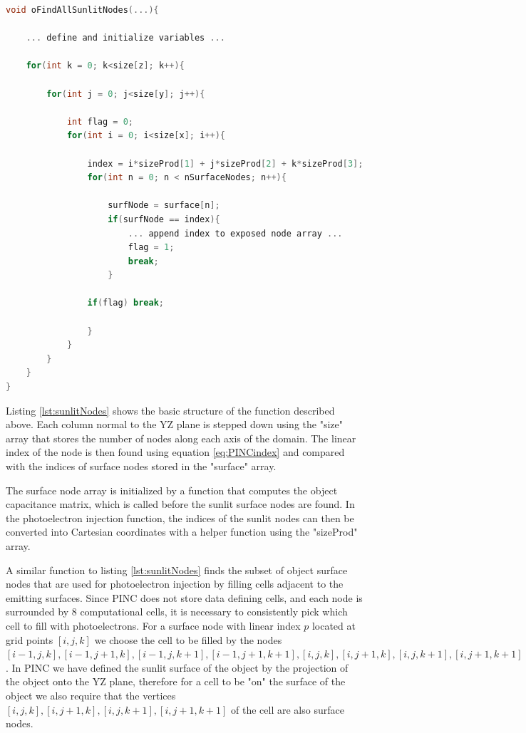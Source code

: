 \begin{minipage}{\linewidth}
\begin{lstlisting}[language=C, caption={Pseudo code for finding sunlit object surface nodes},
label={lst:sunlitNodes}]
void oFindAllSunlitNodes(...){

    ... define and initialize variables ...

    for(int k = 0; k<size[z]; k++){
    
        for(int j = 0; j<size[y]; j++){
                
            int flag = 0;
            for(int i = 0; i<size[x]; i++){
                
                index = i*sizeProd[1] + j*sizeProd[2] + k*sizeProd[3];
                for(int n = 0; n < nSurfaceNodes; n++){
                    
                    surfNode = surface[n];
                    if(surfNode == index){
                        ... append index to exposed node array ...
                        flag = 1;
                        break;
                    }
                    
                if(flag) break;
                
                }
            }
        }
    }
}
\end{lstlisting}
\end{minipage}

\vspace{1cm}
Listing \ref{lst:sunlitNodes} shows the basic structure of the function described above. Each column normal to the YZ plane is stepped down using the "size" array that stores the number of nodes along each axis of the domain. The linear index of the node is then found using equation \eqref{eq:PINCindex} and compared with the indices of surface nodes stored in the "surface" array. 

The surface node array is initialized by a function that computes the object capacitance matrix, which is called before the sunlit surface nodes are found. In the photoelectron injection function, the indices of the sunlit nodes can then be converted into Cartesian coordinates with a helper function using the "sizeProd" array. 

A similar function to listing \ref{lst:sunlitNodes} finds the subset of object surface nodes that are used for photoelectron injection by filling cells adjacent to the emitting surfaces.
Since PINC does not store data defining cells, and each node is surrounded by 8 computational cells, it is necessary to consistently pick which cell to fill with photoelectrons. For a surface node with linear index $p$ located at grid points $[i,j,k]$ we choose the cell to be filled by the nodes $[i-1,j,k], [i-1,j+1,k], [i-1,j,k+1], [i-1,j+1,k+1], [i,j,k], [i,j+1,k], [i,j,k+1], [i,j+1,k+1]$. In PINC we have defined the sunlit surface of the object by the projection of the object onto the YZ plane, therefore for a cell to be "on" the surface of the object we also require that the vertices $[i,j,k], [i,j+1,k], [i,j,k+1], [i,j+1,k+1]$ of the cell are also surface nodes.

